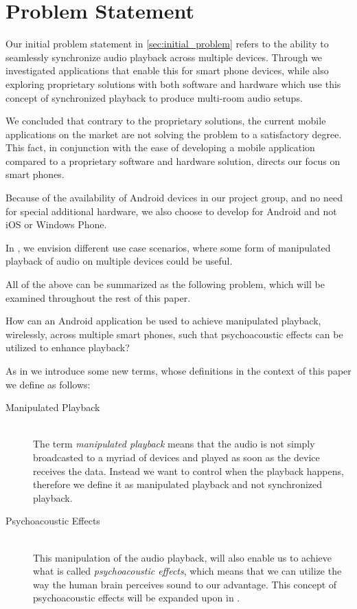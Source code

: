 \chapter{Problem Statement}\label{cha:problem_statement}
Our initial problem statement in \cref{sec:initial_problem} refers to the ability to seamlessly synchronize audio playback across multiple devices.
Through  we investigated applications that enable this for smart phone devices, while also exploring proprietary solutions with both software and hardware which use this concept of synchronized playback to produce multi-room audio setups.

We concluded that contrary to the proprietary solutions, the current mobile applications on the market are not solving the problem to a satisfactory degree.
This fact, in conjunction with the ease of developing a mobile application compared to a proprietary software and hardware solution, directs our focus on smart phones.

Because of the availability of Android devices in our project group, and no need for special additional hardware, we also choose to develop for Android and not iOS or Windows Phone.

In , we envision different use case scenarios, where some form of manipulated playback of audio on multiple devices could be useful.

\bigskip
All of the above can be summarized as the following problem, which will be examined throughout the rest of this paper.

\begin{problemstatement}
    How can an Android application be used to achieve manipulated playback, wirelessly, across multiple smart phones, such that psychoacoustic effects can be utilized to enhance playback?
\end{problemstatement}

\bigskip\noindent
As in  we introduce some new terms, whose definitions in the context of this paper we define as follows:

\begin{description}
    \item[Manipulated Playback] \hfill \\
        The term \textit{manipulated playback} means that the audio is not simply broadcasted to a myriad of devices and played as soon as the device receives the data.
        Instead we want to control when the playback happens, therefore we define it as manipulated playback and not synchronized playback.
    \item[Psychoacoustic Effects] \hfill \\
        This manipulation of the audio playback, will also enable us to achieve what is called \textit{psychoacoustic effects}, which means that we can utilize the way the human brain perceives sound to our advantage.
        This concept of psychoacoustic effects will be expanded upon in .
\end{description}
